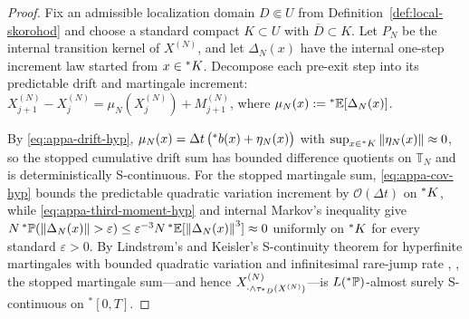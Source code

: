 \begin{proof}
Fix an admissible localization domain $D \Subset U$ from Definition~\ref{def:local-skorohod} and choose a standard compact $K \subset U$ with $\overline{D} \subset K$. Let $P_N$ be the internal transition kernel of $X^{(N)}$, and let $\Delta_N(x)$ have the internal one-step increment law started from $x \in {}^*K$. Decompose each pre-exit step into its predictable drift and martingale increment: $X_{j+1}^{(N)} - X_j^{(N)} = \mu_N(X_j^{(N)}) + M_{j+1}^{(N)}$, where $\mu_N(x) := {}^*\mathbb{E}[\Delta_N(x)]$.

By \eqref{eq:appa-drift-hyp}, $\mu_N(x) = \Delta t\,\bigl({}^*b(x) + \eta_N(x)\bigr)$ with $\sup_{x \in {}^*K} \left\lVert \eta_N(x) \right\rVert \approx 0$, so the stopped cumulative drift sum has bounded difference quotients on $\mathbb{T}_N$ and is deterministically S-continuous. For the stopped martingale sum, \eqref{eq:appa-cov-hyp} bounds the predictable quadratic variation increment by $\mathcal{O}(\Delta t)$ on ${}^*K$, while \eqref{eq:appa-third-moment-hyp} and internal Markov's inequality give $N\,{}^*\mathbb{P}(\left\lVert \Delta_N(x) \right\rVert > \varepsilon) \le \varepsilon^{-3} N\,{}^*\mathbb{E}[\left\lVert \Delta_N(x) \right\rVert^3] \approx 0$ uniformly on ${}^*K$ for every standard $\varepsilon > 0$. By Lindstr\o m's and Keisler's S-continuity theorem for hyperfinite martingales with bounded quadratic variation and infinitesimal rare-jump rate \cite[Section III.3]{lindstrom1988invitation}, \cite{keisler1984infinitesimal}, the stopped martingale sum---and hence $X_{\cdot \wedge \tau_{{}^*D}(X^{(N)})}^{(N)}$---is $L({}^*\mathbb{P})$-almost surely S-continuous on ${}^*[0, T]$.


\end{proof}
